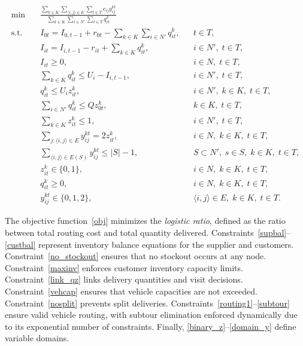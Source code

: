 \documentclass{article}
\begin{document}
\begin{align}
    \min \quad & \frac{\displaystyle \sum_{k \in K} \sum_{\langle i,j\rangle \in E} \sum_{t \in T} c_{ij} y_{ij}^{kt}}
    {\displaystyle \sum_{k \in K} \sum_{i \in N'} \sum_{t \in T} q_{it}^k} \label{obj} \\
    \text{s.t.} \quad 
    & I_{0t} = I_{0,t-1} + r_{0t} - \sum_{k \in K} \sum_{i \in N'} q_{it}^k, && t \in T, \label{supbal} \\
    & I_{it} = I_{i,t-1} - r_{it} + \sum_{k \in K} q_{it}^k, && i \in N', \; t \in T, \label{custbal} \\
    & I_{it} \ge 0, && i \in N, \; t \in T, \label{no_stockout} \\
    & \sum_{k \in K} q_{it}^k \le U_i - I_{i,t-1}, && i \in N', \; t \in T, \label{maxinv} \\
    & q_{it}^k \le U_i z_{it}^k, && i \in N', \; k \in K, \; t \in T, \label{link_qz} \\
    & \sum_{i \in N'} q_{it}^k \le Q z_{0t}^k, && k \in K, \; t \in T, \label{vehcap} \\
    & \sum_{k \in K} z_{it}^k \le 1, && i \in N', \; t \in T, \label{nosplit} \\
    & \sum_{j: \langle i,j \rangle \in E} y_{ij}^{kt} = 2 z_{it}^k, && i \in N, \; k \in K, \; t \in T, \label{routing1} \\
    & \sum_{\langle i,j \rangle \in E(S)} y_{ij}^{kt} \le |S| - 1, && S \subset N', \; s \in S, \; k \in K, \; t \in T, \label{subtour} \\
    & z_{it}^k \in \{0,1\}, && i \in N, \; k \in K, \; t \in T, \label{binary_z} \\
    & q_{it}^k \ge 0, && i \in N, \; k \in K, \; t \in T, \label{nonneg_q} \\
    & y_{ij}^{kt} \in \{0,1,2\}, && \langle i,j\rangle \in E, \; k \in K, \; t \in T. \label{domain_y}
\end{align}

The objective function~\eqref{obj} minimizes the \emph{logistic ratio}, defined as the ratio between total routing cost and total quantity delivered.  
Constraints~\eqref{supbal}–\eqref{custbal} represent inventory balance equations for the supplier and customers.  
Constraint~\eqref{no_stockout} ensures that no stockout occurs at any node.  
Constraint~\eqref{maxinv} enforces customer inventory capacity limits.  
Constraint~\eqref{link_qz} links delivery quantities and visit decisions.  
Constraint~\eqref{vehcap} ensures that vehicle capacities are not exceeded.  
Constraint~\eqref{nosplit} prevents split deliveries.  
Constraints~\eqref{routing1}–\eqref{subtour} ensure valid vehicle routing, with subtour elimination enforced dynamically due to its exponential number of constraints.  
Finally, \eqref{binary_z}–\eqref{domain_y} define variable domains.
\end{document}
